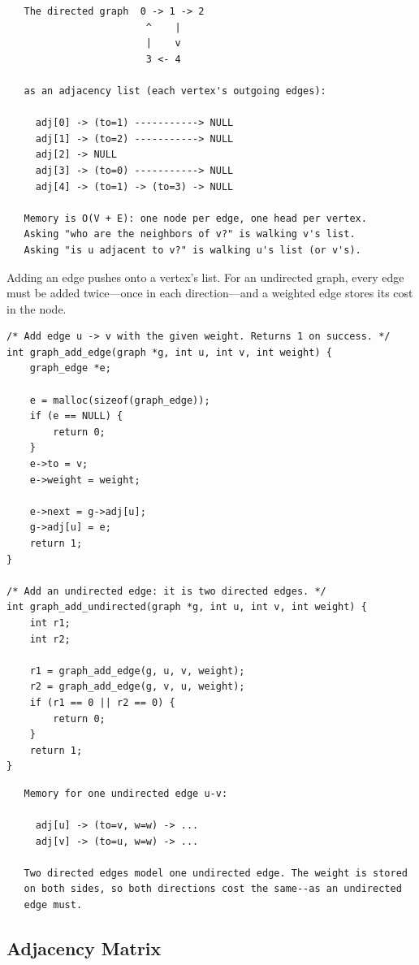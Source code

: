 \begin{verbatim}
   The directed graph  0 -> 1 -> 2
                        ^    |
                        |    v
                        3 <- 4

   as an adjacency list (each vertex's outgoing edges):

     adj[0] -> (to=1) -----------> NULL
     adj[1] -> (to=2) -----------> NULL
     adj[2] -> NULL
     adj[3] -> (to=0) -----------> NULL
     adj[4] -> (to=1) -> (to=3) -> NULL

   Memory is O(V + E): one node per edge, one head per vertex.
   Asking "who are the neighbors of v?" is walking v's list.
   Asking "is u adjacent to v?" is walking u's list (or v's).
\end{verbatim}

Adding an edge pushes onto a vertex's list. For an undirected graph,
every edge must be added twice---once in each direction---and a
weighted edge stores its cost in the node.

\begin{lstlisting}[caption={Add a directed edge, and its undirected twin.}]
/* Add edge u -> v with the given weight. Returns 1 on success. */
int graph_add_edge(graph *g, int u, int v, int weight) {
    graph_edge *e;

    e = malloc(sizeof(graph_edge));
    if (e == NULL) {
        return 0;
    }
    e->to = v;
    e->weight = weight;

    e->next = g->adj[u];
    g->adj[u] = e;
    return 1;
}

/* Add an undirected edge: it is two directed edges. */
int graph_add_undirected(graph *g, int u, int v, int weight) {
    int r1;
    int r2;

    r1 = graph_add_edge(g, u, v, weight);
    r2 = graph_add_edge(g, v, u, weight);
    if (r1 == 0 || r2 == 0) {
        return 0;
    }
    return 1;
}
\end{lstlisting}

\begin{verbatim}
   Memory for one undirected edge u-v:

     adj[u] -> (to=v, w=w) -> ...
     adj[v] -> (to=u, w=w) -> ...

   Two directed edges model one undirected edge. The weight is stored
   on both sides, so both directions cost the same--as an undirected
   edge must.
\end{verbatim}

\subsection{Adjacency Matrix}


